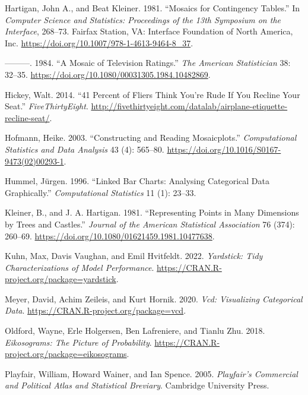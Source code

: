 \begin{CSLReferences}{1}{0}
\leavevmode{}%
Hartigan, John A., and Beat Kleiner. 1981. {``Mosaics for Contingency Tables.''} In \emph{Computer Science and Statistics: Proceedings of the 13th Symposium on the Interface}, 268--73. Fairfax Station, VA: Interface Foundation of North America, Inc. \url{https://doi.org/10.1007/978-1-4613-9464-8_37}.

\leavevmode{}%
---------. 1984. {``A Mosaic of Television Ratings.''} \emph{The American Statistician} 38: 32--35. \url{https://doi.org/10.1080/00031305.1984.10482869}.

\leavevmode{}%
Hickey, Walt. 2014. {``41 Percent of Fliers Think You're Rude If You Recline Your Seat.''} \emph{FiveThirtyEight}. \url{http://fivethirtyeight.com/datalab/airplane-etiquette-recline-seat/}.

\leavevmode{}%
Hofmann, Heike. 2003. {``Constructing and Reading Mosaicplots.''} \emph{Computational Statistics and Data Analysis} 43 (4): 565--80. \url{https://doi.org/10.1016/S0167-9473(02)00293-1}.

\leavevmode{}%
Hummel, Jürgen. 1996. {``Linked Bar Charts: Analysing Categorical Data Graphically.''} \emph{Computational Statistics} 11 (1): 23--33.

\leavevmode{}%
Kleiner, B., and J. A. Hartigan. 1981. {``Representing Points in Many Dimensions by Trees and Castles.''} \emph{Journal of the American Statistical Association} 76 (374): 260--69. \url{https://doi.org/10.1080/01621459.1981.10477638}.

\leavevmode{}%
Kuhn, Max, Davis Vaughan, and Emil Hvitfeldt. 2022. \emph{Yardstick: Tidy Characterizations of Model Performance}. \url{https://CRAN.R-project.org/package=yardstick}.

\leavevmode{}%
Meyer, David, Achim Zeileis, and Kurt Hornik. 2020. \emph{Vcd: Visualizing Categorical Data}. \url{https://CRAN.R-project.org/package=vcd}.

\leavevmode{}%
Oldford, Wayne, Erle Holgersen, Ben Lafreniere, and Tianlu Zhu. 2018. \emph{Eikosograms: The Picture of Probability}. \url{https://CRAN.R-project.org/package=eikosograms}.

\leavevmode{}%
Playfair, William, Howard Wainer, and Ian Spence. 2005. \emph{Playfair's Commercial and Political Atlas and Statistical Breviary}. Cambridge University Press.


\end{CSLReferences}
